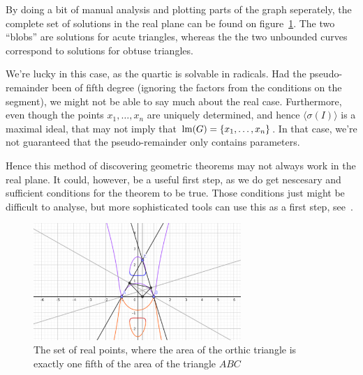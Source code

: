 \begin{example}
  By doing a bit of manual analysis and plotting parts of the graph seperately, the complete set of solutions in the real plane can be found on figure~\ref{fig:orthic_wow}. The two ``blobs'' are solutions for acute triangles, whereas the the two unbounded curves correspond to solutions for obtuse triangles.

  We're lucky in this case, as the quartic is solvable in radicals. Had the pseudo-remainder been of fifth degree (ignoring the factors from the conditions on the segment), we might not be able to say much about the real case. Furthermore, even though the points $x_{1}, \dots, x_{n}$ are uniquely determined, and hence $\langle \sigma(I) \rangle$ is a maximal ideal, that may not imply that $\operatorname{lm}(G) = \{x_{1}, \dots, x_{n}\}$. In that case, we're not guaranteed that the pseudo-remainder only contains parameters.

  Hence this method of discovering geometric theorems may not always work in the real plane. It could, however, be a useful first step, as we do get nescesary and sufficient conditions for the theorem to be true. Those conditions just might be difficult to analyse, but more sophisticated tools can use this as a first step, see~\cite{10.1145/2755996.2756646}.

\end{example}

\begin{figure}[t]
  \begin{center}
    \includegraphics[width=0.7\textwidth]{geogebra_orthic_wow2.png}
  \end{center}
  \caption{The set of real points, where the area of the orthic triangle is exactly one fifth of the area of the triangle $ABC$}\label{fig:orthic_wow}
\end{figure}










